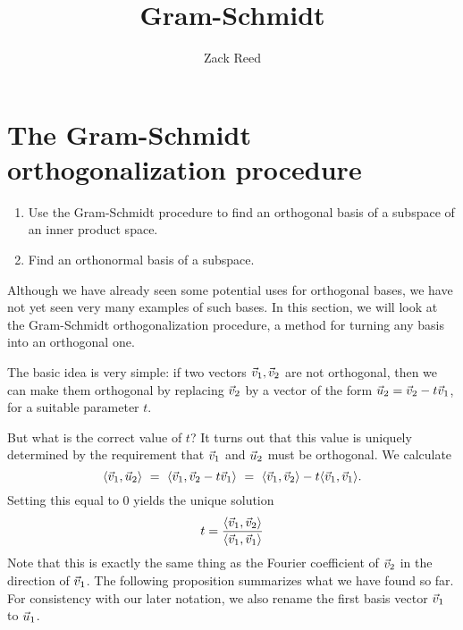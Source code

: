 \documentclass{ximera}
\author{Zack Reed}
\title{Gram-Schmidt}
\begin{document}
\begin{abstract}


\end{abstract}
\maketitle


\section{The Gram-Schmidt orthogonalization procedure}
\label{sec:gram-schmidt}

  \begin{enumerate}
  \item Use the Gram-Schmidt procedure to find an orthogonal basis
    of a subspace of an inner product space.
  \item Find an orthonormal basis of a subspace.
  \end{enumerate}

Although we have already seen some potential uses for orthogonal
bases, we have not yet seen very many examples of such bases. In this
section, we will look at the Gram-Schmidt orthogonalization procedure,
a method for turning any basis into an orthogonal one.

The basic idea is very simple: if two vectors $\vec{v}_1,\vec{v}_2$
are not orthogonal, then we can make them orthogonal by replacing
$\vec{v}_2$ by a vector of the form $\vec{u}_2 = \vec{v}_2 -
t\vec{v}_1$, for a suitable parameter $t$.
\begin{center}
\end{center}
But what is the correct value of $t$? It turns out that this value is
uniquely determined by the requirement that $\vec{v}_1$ and
$\vec{u}_2$ must be orthogonal. We calculate
\begin{equation*}
  \langle \vec{v}_1,\vec{u}_2 \rangle
  ~=~ \langle \vec{v}_1,\vec{v}_2-t\vec{v}_1 \rangle
  ~=~ \langle \vec{v}_1,\vec{v}_2 \rangle-t\langle \vec{v}_1,\vec{v}_1 \rangle.
\end{equation*}
Setting this equal to $0$ yields the unique solution
\begin{equation*}
  t = \frac{\langle \vec{v}_1,\vec{v}_2 \rangle}{\langle \vec{v}_1,\vec{v}_1 \rangle}
\end{equation*}
Note that this is exactly the same thing as the Fourier coefficient of
$\vec{v}_2$ in the direction of $\vec{v}_1$. The following
proposition summarizes what we have found so far. For consistency with
our later notation, we also rename the first basis vector $\vec{v}_1$
to $\vec{u}_1$.
\end{document}
